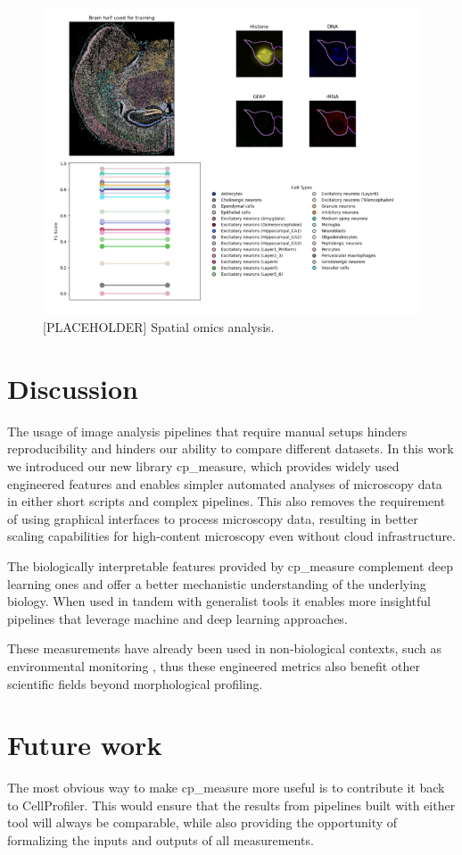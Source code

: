 \documentclass{article}
\begin{document}
\begin{figure}[htbp]
\centering
\includegraphics[width=.9\linewidth]{./figs/spatial.png}
\caption{\label{fig:spatial_omics}{[}PLACEHOLDER] Spatial omics analysis.}
\end{figure}
\section{Discussion}
\label{sec:orgf37b369}
The usage of image analysis pipelines that require manual setups hinders reproducibility and hinders our ability to compare different datasets. In this work we introduced our new library cp\_measure, which provides widely used engineered features and enables simpler automated analyses of microscopy data in either short scripts and complex pipelines. This also removes the requirement of using graphical interfaces to process microscopy data, resulting in better scaling capabilities for high-content microscopy even without cloud infrastructure.

The biologically interpretable features provided by cp\_measure complement deep learning ones and offer a better mechanistic understanding of the underlying biology. When used in tandem with generalist tools it enables more insightful pipelines that leverage machine and deep learning approaches. 

These measurements have already been used in non-biological contexts, such as environmental monitoring \citep{ideharaExploringNileRed2025}, thus these engineered metrics also benefit other scientific fields beyond morphological profiling.
\section{Future work}
\label{sec:org5cdbb12}
The most obvious way to make cp\_measure more useful is to contribute it back to CellProfiler. This would ensure that the results from pipelines built with either tool will always be comparable, while also providing the opportunity of formalizing the inputs and outputs of all measurements. 
\end{document}
